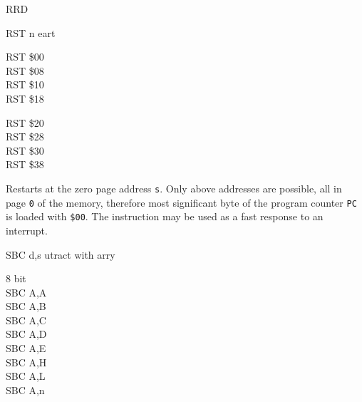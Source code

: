 \begin{basedescript}{
    \desclabelstyle{\multilinelabel}
    \desclabelwidth{3cm}}
\begin{DetailItem}{RRD}
        \begin{DetailTiming}
        \end{DetailTiming}

    \end{DetailItem}

    \begin{DetailItem}{RST n}
        {eart}
        {}

        \begin{DetailVariants}
            RST \$00\\
            RST \$08\\
            RST \$10\\
            RST \$18
			
            \columnbreak
            RST \$20\\
            RST \$28\\
            RST \$30\\
            RST \$38
        \end{DetailVariants}

        Restarts at the zero page address {\tt s}. Only above addresses are possible, all in page {\tt 0} of the memory, therefore most significant byte of the program counter {\tt PC} is loaded with {\tt \$00}. The instruction may be used as a fast response to an interrupt.

        \begin{DetailEffects}
            \FlagsRSTn				
        \end{DetailEffects}

        \begin{DetailTiming}
        \end{DetailTiming}

    \end{DetailItem}

    \pagebreak
    \begin{DetailItem}{SBC d,s}
        {utract with arry}
        {}
	
        \begin{DetailVariants}
            \textnormal{8 bit}\\
            SBC A,A\\
            SBC A,B\\
            SBC A,C\\
            SBC A,D\\
            SBC A,E\\
            SBC A,H\\
            SBC A,L\\
            SBC A,n


\end{DetailVariants}
\end{DetailItem}
\end{basedescript}
